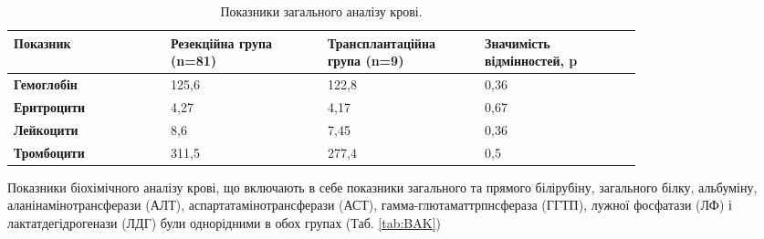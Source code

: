 \begin{table}[]
\centering
\caption{Показники загального аналізу крові.}
\label{tab:ZAK}
\begin{tabular}{|p{0.2\linewidth}|
                 p{0.2\linewidth}|
                 p{0.2\linewidth}|
                 p{0.2\linewidth}|}
\hline
{\color[HTML]{231F20} \textbf{Показник}} &
  {\color[HTML]{231F20} \textbf{Резекційна група (n=81)}} &
  {\color[HTML]{231F20} \textbf{Транс\-план\-таційна група (n=9)}} &
  {\color[HTML]{231F20} \textbf{Значимість відмінностей, p}} \\ \hline
{\color[HTML]{231F20} \textbf{Гемоглобін}} & {\color[HTML]{231F20} 125,6} & {\color[HTML]{231F20} 122,8} & 0,36 \\ \hline
{\color[HTML]{231F20} \textbf{Еритроцити}} & {\color[HTML]{231F20} 4,27}  & {\color[HTML]{231F20} 4,17}  & 0,67 \\ \hline
{\color[HTML]{231F20} \textbf{Лейкоцити}}  & {\color[HTML]{231F20} 8,6}   & {\color[HTML]{231F20} 7,45}  & 0,36 \\ \hline
{\color[HTML]{231F20} \textbf{Тромбоцити}} & {\color[HTML]{231F20} 311,5} & {\color[HTML]{231F20} 277,4} & 0,5  \\ \hline
\end{tabular}
\end{table}

 Показники біохімічного аналізу крові, що включають в себе показники загального та прямого білірубіну, загального білку, альбуміну, аланінамінотрансферази (АЛТ), аспартатамінотрансферази (АСТ), гамма-глютаматтрпнсфераза (ГГТП), лужної фосфатази (ЛФ) і лактатдегідрогенази (ЛДГ) були однорідними в обох групах (Таб. \ref{tab:BAK})

